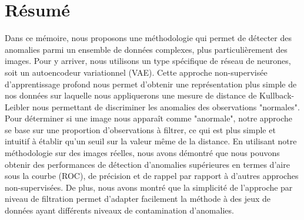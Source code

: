 \chapter*{Résumé}             %
\label{chap:resume}           %


Dans ce mémoire, nous proposons une méthodologie qui permet de détecter des anomalies parmi un ensemble de données complexes, plus particulièrement des images. Pour y arriver, nous utilisons un type spécifique de réseau de neurones, soit un autoencodeur variationnel (VAE). Cette approche non-supervisée d'apprentissage profond nous permet d'obtenir une représentation plus simple de nos données sur laquelle nous appliquerons une mesure de distance de Kullback-Leibler nous permettant de discriminer les anomalies des observations "normales". Pour déterminer si une image nous apparaît comme "anormale", notre approche se base sur une proportion d'observations à filtrer, ce qui est plus simple et intuitif à établir qu'un seuil sur la valeur même de la distance. En utilisant notre méthodologie sur des images réelles, nous avons démontré que nous pouvons obtenir des performances de détection d'anomalies supérieures en termes d'aire sous la courbe (ROC), de précision et de rappel par rapport à d'autres approches non-supervisées. De plus, nous avons montré que la simplicité de l'approche par niveau de filtration permet d'adapter facilement la méthode à des jeux de données ayant différents niveaux de contamination d'anomalies.
